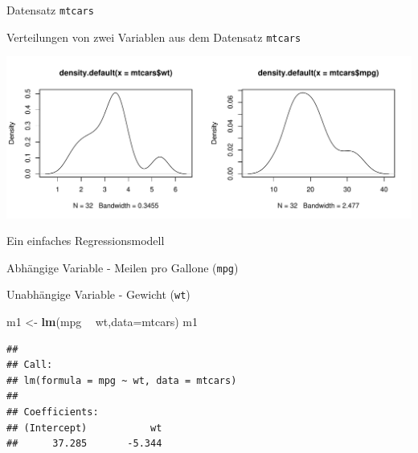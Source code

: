 \documentclass[ignorenonframetext,]{beamer}
\newenvironment{Shaded}{\begin{snugshade}}{\end{snugshade}}
\newcommand{\KeywordTok}[1]{\textcolor[rgb]{0.13,0.29,0.53}{\textbf{#1}}}
\newcommand{\DataTypeTok}[1]{\textcolor[rgb]{0.13,0.29,0.53}{#1}}
\newcommand{\DecValTok}[1]{\textcolor[rgb]{0.00,0.00,0.81}{#1}}
\newcommand{\StringTok}[1]{\textcolor[rgb]{0.31,0.60,0.02}{#1}}
\newcommand{\OperatorTok}[1]{\textcolor[rgb]{0.81,0.36,0.00}{\textbf{#1}}}
\newcommand{\NormalTok}[1]{#1}
\begin{document}
\begin{frame}{Datensatz \texttt{mtcars}}
\end{frame}

\begin{frame}[fragile]{Verteilungen von zwei Variablen aus dem Datensatz
\texttt{mtcars}}

\begin{Shaded}
\end{Shaded}

\includegraphics{B3_linreg_files/figure-beamer/unnamed-chunk-5-1.pdf}

\end{frame}

\begin{frame}[fragile]{Ein einfaches Regressionsmodell}

\begin{block}{Abhängige Variable - Meilen pro Gallone (\texttt{mpg})}

\end{block}

\begin{block}{Unabhängige Variable - Gewicht (\texttt{wt})}

\begin{Shaded}
\begin{Highlighting}[]
\NormalTok{m1 <-}\StringTok{ }\KeywordTok{lm}\NormalTok{(mpg }\OperatorTok{~}\StringTok{ }\NormalTok{wt,}\DataTypeTok{data=}\NormalTok{mtcars)}
\NormalTok{m1}
\end{Highlighting}
\end{Shaded}

\begin{verbatim}
## 
## Call:
## lm(formula = mpg ~ wt, data = mtcars)
## 
## Coefficients:
## (Intercept)           wt  
##      37.285       -5.344
\end{verbatim}

\end{block}

\end{frame}
\end{document}
